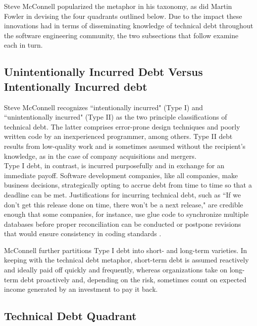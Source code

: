 Steve McConnell \cite{mcconnell} popularized the metaphor in his taxonomy, as did Martin Fowler \cite{fowler} in devising the four quadrants outlined below.  Due to the impact these innovations had in terms of disseminating knowledge of technical debt throughout the software engineering community, the two subsections that follow examine each in turn.


\subsection{Unintentionally Incurred Debt Versus Intentionally Incurred debt}

Steve McConnell recognizes ``intentionally incurred" (Type I) and ``unintentionally incurred" (Type II) as the two principle classifications of technical debt.  The latter comprises error-prone design techniques and poorly written code by an inexperienced programmer, among others.  Type II debt results from low-quality work and is sometimes assumed without the recipient's knowledge, as in the case of company acquisitions and mergers.\\

Type I debt, in contrast, is incurred purposefully and in exchange for an immediate payoff. Software development companies, like all companies, make business decisions, strategically opting to accrue debt from time to time so that a deadline can be met. Justifications for incurring technical debt, such as ``If we don't get this release done on time, there won't be a next release," are credible enough that some companies, for instance, use glue code to synchronize multiple databases before proper reconciliation can be conducted or postpone revisions that would ensure consistency in coding standards \cite{mcconnell}.

McConnell further partitions Type I debt into short- and long-term varieties. In keeping with the technical debt metaphor, short-term debt is assumed reactively and ideally paid off quickly and frequently, whereas organizations take on long-term debt proactively and, depending on the risk, sometimes count on expected income generated by an investment to pay it back.



\subsection{Technical Debt Quadrant}

